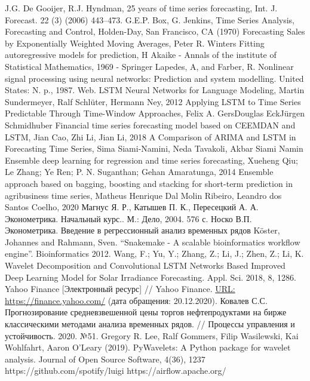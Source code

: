 \documentclass[a4paper,article,14pt]{extarticle}
\begin{document}
\pagebreak
\begin{thebibliography}{1}
 J.G. De Gooijer, R.J. Hyndman, 25 years of time series forecasting, Int. J. Forecast. 22 (3) (2006) 443–473.
 G.E.P. Box, G. Jenkins, Time Series Analysis, Forecasting and Control, Holden-Day, San Francisco, CA (1970)
 Forecasting Sales by Exponentially Weighted Moving Averages, Peter R. Winters
 Fitting autoregressive models for prediction, H Akaike - Annals of the institute of Statistical Mathematics, 1969 - Springer
 Lapedes, A, and Farber, R. Nonlinear signal processing using neural networks: Prediction and system modelling. United States: N. p., 1987. Web.
 LSTM Neural Networks for Language Modeling, Martin Sundermeyer, Ralf Schlüter, Hermann Ney, 2012
 Applying LSTM to Time Series Predictable Through Time-Window Approaches, Felix A. GersDouglas EckJürgen Schmidhuber
 Financial time series forecasting model based on CEEMDAN and LSTM, Jian Cao, Zhi Li, Jian Li, 2018
 A Comparison of ARIMA and LSTM in Forecasting Time Series, Sima Siami-Namini, Neda Tavakoli, Akbar Siami Namin
 Ensemble deep learning for regression and time series forecasting, Xueheng Qiu; Le Zhang; Ye Ren; P. N. Suganthan; Gehan Amaratunga, 2014
 Ensemble approach based on bagging, boosting and stacking for short-term prediction in agribusiness time series, Matheus Henrique Dal Molin Ribeiro, Leandro dos Santos Coelho, 2020
 Магнус Я. Р., Катышев П. К., Пересецкий А. А. Эконометрика. Начальный курс.. М.: Дело, 2004. 576 с.
 Носко В.П. Эконометрика. Введение в регрессионный анализ временных рядов
 Köster, Johannes and Rahmann, Sven. “Snakemake - A scalable bioinformatics workflow engine”. Bioinformatics 2012.
 Wang, F.; Yu, Y.; Zhang, Z.; Li, J.; Zhen, Z.; Li, K. Wavelet Decomposition and Convolutional LSTM Networks Based Improved Deep Learning Model for Solar Irradiance Forecasting. Appl. Sci. 2018, 8, 1286.
 Yahoo Finance [Электронный ресурс] // Yahoo Finance. \url{URL:  https://finance.yahoo.com/} (дата обращения: 20.12.2020).
 Ковалев С.С. Прогнозирование средневзвешенной цены торгов нефтепродуктами на бирже классическими методами анализа временных рядов. // Процессы управления и устойчивость. 2020. №51.
 Gregory R. Lee, Ralf Gommers, Filip Wasilewski, Kai Wohlfahrt, Aaron O’Leary (2019). PyWavelets: A Python package for wavelet analysis. Journal of Open Source Software, 4(36), 1237
 https://github.com/spotify/luigi
 https://airflow.apache.org/
\end{thebibliography}
\end{document}
